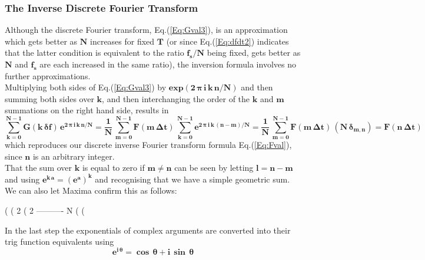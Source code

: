 \documentclass[11pt]{article}
\begin{document}
\subsubsection*{The Inverse Discrete Fourier Transform}
\small
Although the discrete Fourier transform, Eq.(\ref{Eq:Gval3}), is an approximation which gets
  better as $\mathbf{N}$ increases for fixed $\mathbf{T}$ (or since Eq.(\ref{Eq:dfdt2}) indicates
  that the latter condition is equivalent to the ratio $\mathbf{f_{s}/N}$ being fixed, gets
  better as $\mathbf{N}$ and $\mathbf{f_{s}}$ are each increased in the same ratio), the
  inversion formula involves no further approximations.\\
  
\noindent Multiplying both sides of Eq.(\ref{Eq:Gval3}) by 
  $\mathbf{exp(2\,\boldsymbol{\pi}\,i\,k\,n/N)}$ and then summing both sides over $\mathbf{k}$,
  and then interchanging the order of the $\mathbf{k}$ and $\mathbf{m}$ summations on the right
  hand side, results in
\begin{equation}
\mathbf{\sum_{k = 0}^{N-1} G(k\,\boldsymbol{\delta}f)\,e^{2\,\boldsymbol{\pi}\,i\,k\,n/N}} = 
          \mathbf{\frac{1}{N}\,\sum_{m = 0}^{N-1} F(m\,\boldsymbol{\Delta}t)\,
		  \sum_{k = 0}^{N-1} e^{2\,\boldsymbol{\pi}\,i\,k\,(n - m)/N} } =
		  \mathbf{\frac{1}{N}\,\sum_{m = 0}^{N-1} F(m\,\boldsymbol{\Delta}t)\,(N\,\boldsymbol{\delta}_{m,n})} =
		  \mathbf{F(n\,\boldsymbol{\Delta}t)}
\end{equation}
which reproduces our discrete inverse Fourier transform formula Eq.(\ref{Eq:Fval}), since $\mathbf{n}$
  is an arbitrary integer.\\
  
\noindent That the sum over $\mathbf{k}$ is equal to zero if $\mathbf{m \neq n}$ can be seen
  by letting $\mathbf{l = n - m}$ and using $\mathbf{e^{k\,a} = (e^{a})^{k}}$ and recognising that
  we have a simple geometric sum.
We can also let Maxima confirm this as follows: 
\begin{myVerbatim1}
(%
(%
                                 2 %
(%
                                 2 %
                                 ----------
                                     N
(%
(%
\end{myVerbatim1} 
In the last step the exponentials of complex arguments are converted into their
  trig function equivalents using
\begin{equation}
\mathbf{e^{i\,\boldsymbol{\theta}} = \boldsymbol{\cos\,\boldsymbol{\theta}} + i\,\boldsymbol{\sin \,\theta}}
\end{equation}
\end{document}
